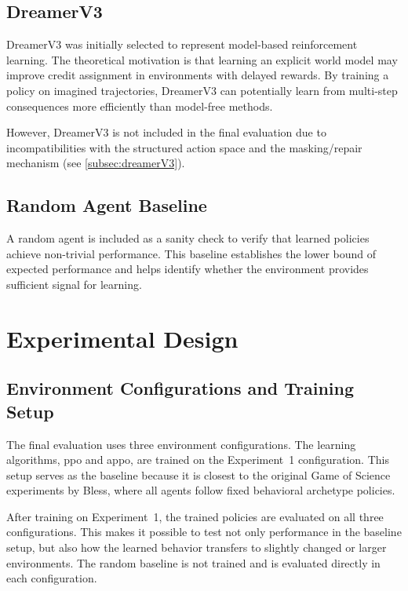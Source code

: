 \documentclass[english,bachelor]{hsluthesis}
\begin{document}
\subsection{DreamerV3}

DreamerV3 was initially selected to represent model-based reinforcement learning. The theoretical motivation is that learning an explicit world model may improve credit assignment in environments with delayed rewards. By training a policy on imagined trajectories, DreamerV3 can potentially learn from multi-step consequences more efficiently than model-free methods.

However, DreamerV3 is not included in the final evaluation due to incompatibilities with the structured action space and the masking/repair mechanism (see \ref{subsec:dreamerV3}).

\subsection{Random Agent Baseline}

A random agent is included as a sanity check to verify that learned policies achieve non-trivial performance. This baseline establishes the lower bound of expected performance and helps identify whether the environment provides sufficient signal for learning.

\section{Experimental Design}

\subsection{Environment Configurations and Training Setup}

The final evaluation uses three environment configurations. The learning algorithms, \gls{ppo} and \gls{appo}, are trained on the Experiment~1 configuration. This setup serves as the baseline because it is closest to the original Game of Science experiments by Bless, where all agents follow fixed behavioral archetype policies.

After training on Experiment~1, the trained policies are evaluated on all three configurations. This makes it possible to test not only performance in the baseline setup, but also how the learned behavior transfers to slightly changed or larger environments. The random baseline is not trained and is evaluated directly in each configuration.
\end{document}
